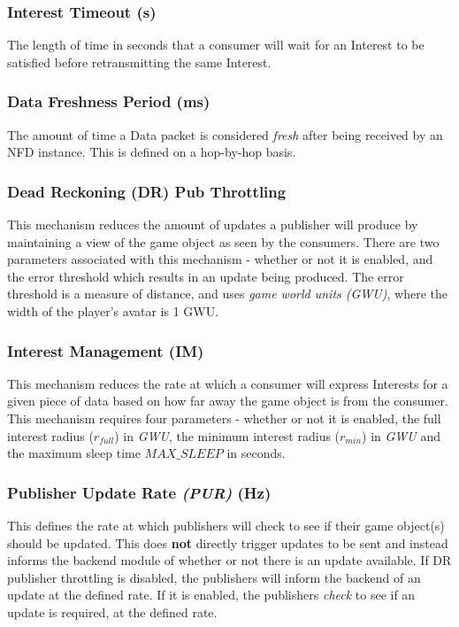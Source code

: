 \subsubsection*{Interest Timeout (s)}
The length of time in seconds that a consumer will wait for an Interest to be satisfied before retransmitting the same Interest.

\subsubsection*{Data Freshness Period (ms)}
The amount of time a Data packet is considered \textit{fresh} after being received by an NFD instance. This is defined on a hop-by-hop basis.

\subsubsection*{Dead Reckoning (DR) Pub Throttling}
This mechanism reduces the amount of updates a publisher will produce by maintaining a view of the game object as seen by the consumers.  There are two parameters associated with this mechanism - whether or not it is enabled, and the error threshold which results in an update being produced. The error threshold is a measure of distance, and uses \textit{game world units (GWU)}, where the width of the player's avatar is 1 GWU.

\subsubsection*{Interest Management (IM)}
This mechanism reduces the rate at which a consumer will express Interests for a given piece of data based on how far away the game object is from the consumer. This mechanism requires four parameters - whether or not it is enabled, the full interest radius ($r_{full}$) in \textit{GWU}, the minimum interest radius ($r_{min}$) in \textit{GWU} and the maximum sleep time $MAX\_SLEEP$ in seconds.

\subsubsection*{Publisher Update Rate \textit{(PUR)} (Hz)}
This defines the rate at which publishers will check to see if their game object(s) should be updated. This does \textbf{not} directly trigger updates to be sent and instead informs the backend module of whether or not there is an update available. If DR publisher throttling is disabled, the publishers will inform the backend of an update at the defined rate. If it is enabled, the publishers \textit{check} to see if an update is required, at the defined rate. 

